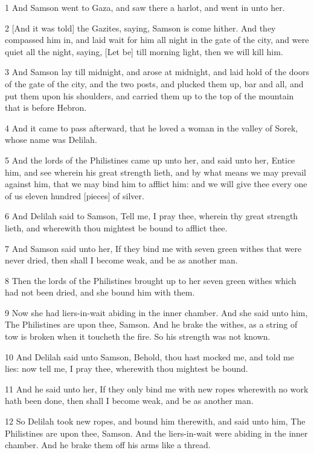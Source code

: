 \par 1 And Samson went to Gaza, and saw there a harlot, and went in unto her.
\par 2 [And it was told] the Gazites, saying, Samson is come hither. And they compassed him in, and laid wait for him all night in the gate of the city, and were quiet all the night, saying, [Let be] till morning light, then we will kill him.
\par 3 And Samson lay till midnight, and arose at midnight, and laid hold of the doors of the gate of the city, and the two posts, and plucked them up, bar and all, and put them upon his shoulders, and carried them up to the top of the mountain that is before Hebron.
\par 4 And it came to pass afterward, that he loved a woman in the valley of Sorek, whose name was Delilah.
\par 5 And the lords of the Philistines came up unto her, and said unto her, Entice him, and see wherein his great strength lieth, and by what means we may prevail against him, that we may bind him to afflict him: and we will give thee every one of us eleven hundred [pieces] of silver.
\par 6 And Delilah said to Samson, Tell me, I pray thee, wherein thy great strength lieth, and wherewith thou mightest be bound to afflict thee.
\par 7 And Samson said unto her, If they bind me with seven green withes that were never dried, then shall I become weak, and be as another man.
\par 8 Then the lords of the Philistines brought up to her seven green withes which had not been dried, and she bound him with them.
\par 9 Now she had liers-in-wait abiding in the inner chamber. And she said unto him, The Philistines are upon thee, Samson. And he brake the withes, as a string of tow is broken when it toucheth the fire. So his strength was not known.
\par 10 And Delilah said unto Samson, Behold, thou hast mocked me, and told me lies: now tell me, I pray thee, wherewith thou mightest be bound.
\par 11 And he said unto her, If they only bind me with new ropes wherewith no work hath been done, then shall I become weak, and be as another man.
\par 12 So Delilah took new ropes, and bound him therewith, and said unto him, The Philistines are upon thee, Samson. And the liers-in-wait were abiding in the inner chamber. And he brake them off his arms like a thread.

